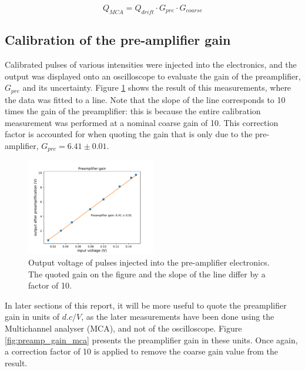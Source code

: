 \begin{equation}
  \label{eq:gain_system}
  Q_{MCA} = Q_{drift}\cdot G_{pre}\cdot G_{coarse}
\end{equation}


\subsection{Calibration of the pre\--amp\-li\-fi\-er gain}
 Calibrated pulses of various intensities were injected into the electronics, and the output was displayed onto an oscilloscope to evaluate the gain of the preamplifier, $G_{pre}$ and its uncertainty. Figure \ref{fig:preamp_gain} shows the result of this measurements, where the data was fitted to a line. Note that the slope of the line corresponds to 10 times the gain of the preamplifier: this is because the entire calibration measurement was performed at a nominal coarse gain of 10. This correction factor is accounted for when quoting the gain that is only due to the pre\--amplifier, $G_{pre} = 6.41 \pm 0.01$.

\begin{figure}[htb!]
  \includegraphics[scale=0.5,width=0.5\textwidth]{graphics/preamp_gain_calibration.pdf}
  \caption{Output voltage of pulses injected into the pre\--amplifier electronics. The quoted gain on the figure and the slope of the line differ by a factor of 10.}
  \label{fig:preamp_gain}
\end{figure}

In later sections of this report, it will be more useful to quote the preamplifier gain in units of $d.c/V$, as the later measurements have been done using the Multichannel analyser (MCA), and not of the oscilloscope. Figure \ref{fig:preamp_gain_mca} presents the preamplifier gain in these units. Once again, a correction factor of 10 is applied to remove the coarse gain value from the result.

